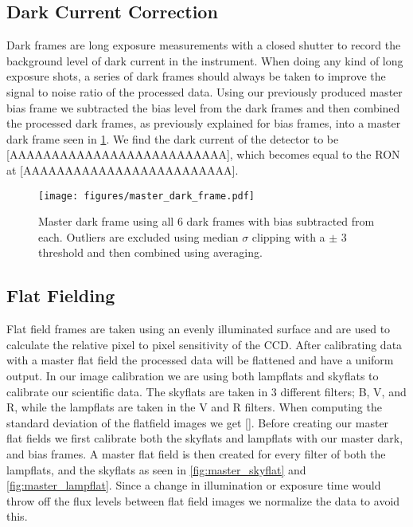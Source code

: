 \documentclass[twocolumn]{aastex631}
\begin{document}
\subsection{Dark Current Correction}
\label{subsec:darks}
Dark frames are long exposure measurements with a closed shutter to record the background level of dark current in the instrument. When doing any kind of long exposure shots, a series of dark frames should always be taken to improve the signal to noise ratio of the processed data. Using our previously produced master bias frame we subtracted the bias level from the dark frames and then combined the processed dark frames, as previously explained for bias frames, into a master dark frame seen in \ref{fig:master_dark}. We find the dark current of the detector to be [AAAAAAAAAAAAAAAAAAAAAAAAAA], which becomes equal to the RON at [AAAAAAAAAAAAAAAAAAAAAAAAA].
\begin{figure}[ht!]
    \begin{centering}
        \texttt{[image: figures/master\_dark\_frame.pdf]}
        \caption{Master dark frame using all 6 dark frames with bias subtracted from each. Outliers are excluded using median $\sigma$ clipping with a $\pm$ 3 threshold and then combined using averaging.}
        \label{fig:master_dark}
    \end{centering}
\end{figure}

\subsection{Flat Fielding}
\label{subsec:flats}
Flat field frames are taken using an evenly illuminated surface and are used to calculate the relative pixel to pixel sensitivity of the CCD. After calibrating data with a master flat field the processed data will be flattened and have a uniform output. In our image calibration we are using both lampflats and skyflats to calibrate our scientific data. The skyflats are taken in 3 different filters; B, V, and R, while the lampflats are taken in the V and R filters. 
When computing the standard deviation of the flatfield images we get []. Before creating our master flat fields we first calibrate both the skyflats and lampflats with our master dark, and bias frames. A master flat field is then created for every filter of both the lampflats, and the skyflats as seen in \ref{fig:master_skyflat} and \ref{fig:master_lampflat}. Since a change in illumination or exposure time would throw off the flux levels between flat field images we normalize the data to avoid this. 
\end{document}
